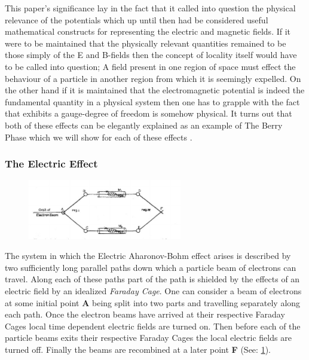 \documentclass{article}
\begin{document}
This paper's significance lay in the fact that it called into question the physical relevance of the potentials which up until then had be considered useful mathematical constructs for representing the electric and magnetic fields. If it were to be maintained that the physically relevant quantities remained to be those simply of the E and B-fields then the concept of locality itself would have to be called into question; A field present in one region of space must effect the behaviour of a particle in another region from which it is seemingly expelled. On the other hand if it is maintained that the electromagnetic potential is indeed the fundamental quantity in a physical system then one has to grapple with the fact that exhibits a gauge-degree of freedom is somehow physical. It turns out that both of these effects can be elegantly explained as an example of The Berry Phase which we will show for each of these effects \cite{Aharonov1959}.

\subsubsection{The Electric Effect}\label{sssec:electric_effect}

 \begin{figure}[h]
   \centering
   \includegraphics[width=0.6\textwidth]{electric_effect}
   \label{fig:ABE}
 \end{figure}
 
The system in which the Electric Aharonov-Bohm effect arises is described by two sufficiently long parallel paths down which a particle beam of electrons can travel. Along each of these paths part of the path is shielded by the effects of an electric field by an idealized \textit{Faraday Cage}. One can consider a beam of electrons at some initial point \textbf{A} being split into two parts and travelling separately along each path. Once the electron beams have arrived at their respective Faraday Cages local time dependent electric fields are turned on. Then before each of the particle beams exits their respective Faraday Cages the local electric fields are turned off. Finally the beams are recombined at a later point \textbf{F} (See: \ref{fig:ABE}).\\
\end{document}

